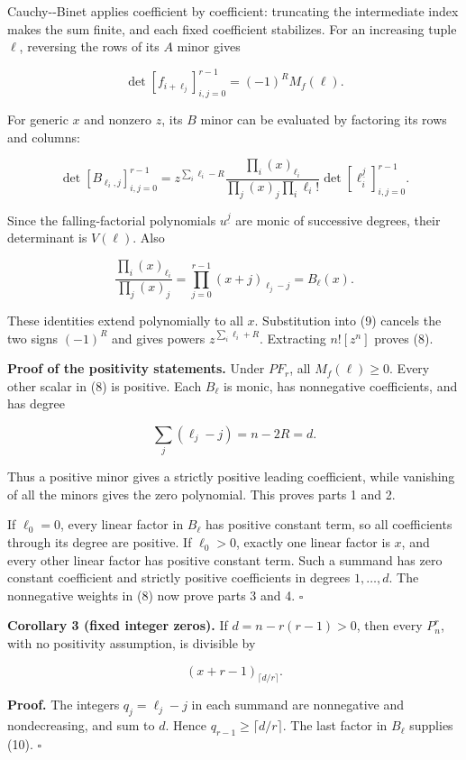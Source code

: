 \documentclass[11pt]{article}
\begin{document}
Cauchy-\/-Binet applies coefficient by coefficient: truncating the
intermediate index makes the sum finite, and each fixed coefficient
stabilizes. For an increasing tuple \(\ell\), reversing the rows of its
\(A\) minor gives

\[
\det[f_{i+\ell_j}]_{i,j=0}^{r-1}=(-1)^R M_f(\ell).
\]

For generic \(x\) and nonzero \(z\), its \(B\) minor can be evaluated by
factoring its rows and columns:

\[
\det[B_{\ell_i,j}]_{i,j=0}^{r-1}
=z^{\sum_i\ell_i-R}
\frac{\prod_i(x)_{\ell_i}}{\prod_j(x)_j\prod_i\ell_i!}
\det[\ell_i^{\underline j}]_{i,j=0}^{r-1}.
\]

Since the falling-factorial polynomials \(u^{\underline j}\) are monic
of successive degrees, their determinant is \(V(\ell)\). Also

\[
\frac{\prod_i(x)_{\ell_i}}{\prod_j(x)_j}
=\prod_{j=0}^{r-1}(x+j)_{\ell_j-j}=B_\ell(x).
\]

These identities extend polynomially to all \(x\). Substitution into (9)
cancels the two signs \((-1)^R\) and gives powers
\(z^{\sum_i\ell_i+R}\). Extracting \(n![z^n]\) proves (8).

\textbf{Proof of the positivity statements.} Under \(PF_r\), all
\(M_f(\ell)\ge0\). Every other scalar in (8) is positive. Each
\(B_\ell\) is monic, has nonnegative coefficients, and has degree

\[
\sum_j(\ell_j-j)=n-2R=d.
\]

Thus a positive minor gives a strictly positive leading coefficient,
while vanishing of all the minors gives the zero polynomial. This proves
parts 1 and 2.

If \(\ell_0=0\), every linear factor in \(B_\ell\) has positive constant
term, so all coefficients through its degree are positive. If
\(\ell_0>0\), exactly one linear factor is \(x\), and every other linear
factor has positive constant term. Such a summand has zero constant
coefficient and strictly positive coefficients in degrees
\(1,\ldots,d\). The nonnegative weights in (8) now prove parts 3 and 4.
\(\square\)

\textbf{Corollary 3 (fixed integer zeros).} If \(d=n-r(r-1)>0\), then
every \(P_n^r\), with no positivity assumption, is divisible by

\[
(x+r-1)_{\lceil d/r\rceil}.
\tag{10}
\]

\textbf{Proof.} The integers \(q_j=\ell_j-j\) in each summand are
nonnegative and nondecreasing, and sum to \(d\). Hence
\(q_{r-1}\ge\lceil d/r\rceil\). The last factor in \(B_\ell\) supplies
(10). \(\square\)
\end{document}
